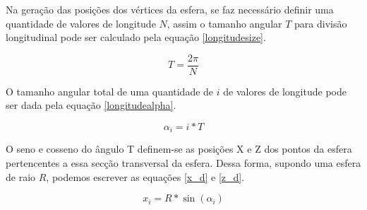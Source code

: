 \documentclass[conference]{IEEEtran}
\begin{document}

Na geração das posições dos vértices da esfera, se faz necessário definir uma quantidade de valores de longitude $N$, assim o tamanho angular $T$ para divisão longitudinal pode ser calculado pela equação \ref{longitudesize}.


\begin{equation}
T = \frac{2 \pi}{N}
\label{longitudesize}
\end{equation}

O tamanho angular total de uma quantidade de $i$ de valores de longitude pode ser dada pela equação \ref{longitudealpha}.

\begin{equation}
\alpha_{i} = i * T
\label{longitudealpha}
\end{equation}

O seno e cosseno do ângulo T definem-se as posições X e Z dos pontos da esfera pertencentes a essa secção transversal da esfera. Dessa forma, supondo uma esfera de raio $R$, podemos escrever as equações \ref{x_d} e \ref{z_d}.

\begin{equation}
x_{i} = R * \sin(\alpha_{i})
\label{x_d}
\end{equation}
\end{document}
